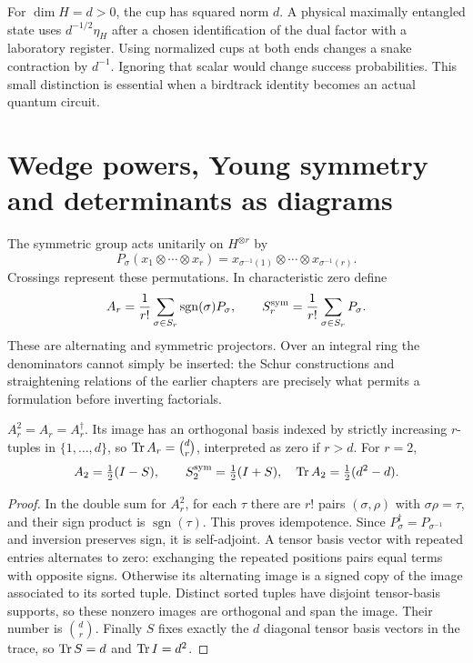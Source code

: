 For $\dim H=d>0$, the cup has squared norm $d$. A physical maximally entangled state uses $d^{-1/2}\eta_H$ after a chosen identification of the dual factor with a laboratory register. Using normalized cups at both ends changes a snake contraction by $d^{-1}$. Ignoring that scalar would change success probabilities. This small distinction is essential when a birdtrack identity becomes an actual quantum circuit.

\section{Wedge powers, Young symmetry and determinants as diagrams}

The symmetric group acts unitarily on $H^{\otimes r}$ by
\[
 P_\sigma(x_1\otimes\cdots\otimes x_r)
 =x_{\sigma^{-1}(1)}\otimes\cdots\otimes x_{\sigma^{-1}(r)}.
\]
Crossings represent these permutations. In characteristic zero define
\[
 A_r=\frac1{r!}\sum_{\sigma\in S_r}\operatorname{sgn}(\sigma)P_\sigma,
 \qquad S_r^{\rm sym}=\frac1{r!}\sum_{\sigma\in S_r}P_\sigma.
\]
These are alternating and symmetric projectors. Over an integral ring the denominators cannot simply be inserted: the Schur constructions and straightening relations of the earlier chapters are precisely what permits a formulation before inverting factorials.

\begin{proposition}
$A_r^2=A_r=A_r^\dagger$. Its image has an orthogonal basis indexed by strictly increasing $r$-tuples in $\{1,\ldots,d\}$, so
$\operatorname{Tr} A_r=\binom dr$, interpreted as zero if $r>d$. For $r=2$,
\[
 A_2=\tfrac12(I-S),\qquad S_2^{\rm sym}=\tfrac12(I+S),
 \quad \operatorname{Tr} A_2=\tfrac12(d^2-d).
\]
\end{proposition}
\begin{proof}
In the double sum for $A_r^2$, for each $\tau$ there are $r!$ pairs $(\sigma,\rho)$ with $\sigma\rho=\tau$, and their sign product is $\operatorname{sgn}(\tau)$. This proves idempotence. Since $P_\sigma^\dagger=P_{\sigma^{-1}}$ and inversion preserves sign, it is self-adjoint. A tensor basis vector with repeated entries alternates to zero: exchanging the repeated positions pairs equal terms with opposite signs. Otherwise its alternating image is a signed copy of the image associated to its sorted tuple. Distinct sorted tuples have disjoint tensor-basis supports, so these nonzero images are orthogonal and span the image. Their number is $\binom dr$. Finally $S$ fixes exactly the $d$ diagonal tensor basis vectors in the trace, so $\operatorname{Tr} S=d$ and $\operatorname{Tr} I=d^2$.
\end{proof}

